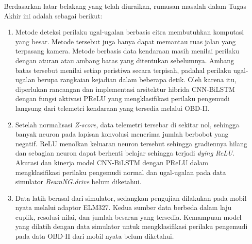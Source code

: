 Berdasarkan latar belakang yang telah diuraikan, rumusan masalah dalam Tugas Akhir ini adalah sebagai berikut:
\begin{enumerate}
    \item Metode deteksi perilaku ugal-ugalan berbasis citra membutuhkan komputasi yang besar. Metode tersebut juga hanya dapat memantau ruas jalan yang terpasang kamera. Metode berbasis data kendaraan masih menilai perilaku dengan aturan atau ambang batas yang ditentukan sebelumnya. Ambang batas tersebut menilai setiap peristiwa secara terpisah, padahal perilaku ugal-ugalan berupa rangkaian kejadian dalam beberapa detik. Oleh karena itu, diperlukan rancangan dan implementasi arsitektur hibrida CNN-BiLSTM dengan fungsi aktivasi PReLU yang mengklasifikasi perilaku pengemudi langsung dari telemetri kendaraan yang tersedia melalui OBD-II.
    \item Setelah normalisasi \textit{Z-score}, data telemetri tersebar di sekitar nol, sehingga banyak neuron pada lapisan konvolusi menerima jumlah berbobot yang negatif. ReLU menolkan keluaran neuron tersebut sehingga gradiennya hilang dan sebagian neuron dapat berhenti belajar sehingga terjadi \textit{dying ReLU}. Akurasi dan kinerja model CNN-BiLSTM dengan PReLU dalam mengklasifikasi perilaku pengemudi normal dan ugal-ugalan pada data simulator \textit{BeamNG.drive} belum diketahui.
    \item Data latih berasal dari simulator, sedangkan pengujian dilakukan pada mobil nyata melalui adaptor ELM327. Kedua sumber data berbeda dalam laju cuplik, resolusi nilai, dan jumlah besaran yang tersedia. Kemampuan model yang dilatih dengan data simulator untuk mengklasifikasi perilaku pengemudi pada data OBD-II dari mobil nyata belum diketahui.
\end{enumerate}

